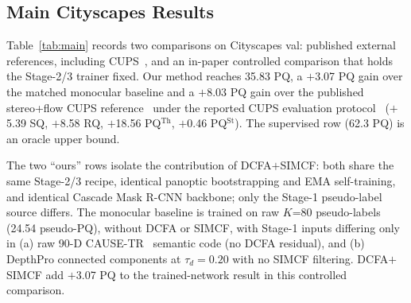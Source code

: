 \documentclass{article}
\begin{document}
\subsection{Main Cityscapes Results}
\label{sec:exp:main}

Table~\ref{tab:main} records two comparisons on Cityscapes val: published external references, including CUPS~\cite{hahn2025cups}, and an in-paper controlled comparison that holds the Stage-2/3 trainer fixed. Our method reaches 35.83 PQ, a $+$3.07 PQ gain over the matched monocular baseline and a $+$8.03 PQ gain over the published stereo+flow CUPS reference~\cite{hahn2025cups} under the reported CUPS evaluation protocol~\cite{hahn2025cups} ($+$5.39 SQ, $+$8.58 RQ, $+$18.56 PQ$^\text{Th}$, $+$0.46 PQ$^\text{St}$). The supervised row (62.3 PQ) is an oracle upper bound.

The two ``ours'' rows isolate the contribution of DCFA$+$SIMCF: both share the same Stage-2/3 recipe, identical panoptic bootstrapping and EMA self-training, and identical Cascade Mask R-CNN backbone; only the Stage-1 pseudo-label source differs. The monocular baseline is trained on raw $K$=80 pseudo-labels (24.54 pseudo-PQ), without DCFA or SIMCF, with Stage-1 inputs differing only in (a) raw 90-D CAUSE-TR~\cite{kim2024cause} semantic code (no DCFA residual), and (b) DepthPro connected components at $\tau_d = 0.20$ with no SIMCF filtering. DCFA$+$SIMCF add $+$3.07 PQ to the trained-network result in this controlled comparison.
\end{document}
